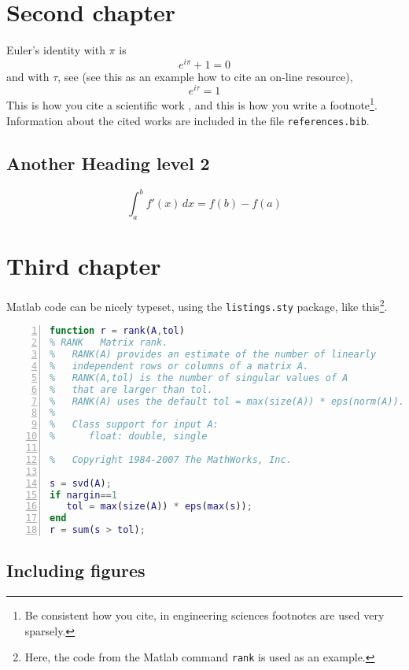 \documentclass[10pt,oneside,english]{lips}
\begin{document}
\section{Second chapter}
Euler's identity with $\pi$ is
\begin{equation}
  e^{i\pi} + 1 = 0
\end{equation}
and with $\tau$, see \citep{HartVi:2011} (see this as an example how
to cite an on-line resource), 
\begin{equation}
  e^{i\tau} = 1
\end{equation}
This is how you cite a scientific work \citep{einstein1905uber}, and
this is how you write a footnote\footnote{Be consistent how you cite,
  in engineering sciences footnotes are used very
  sparsely.}. Information about the cited works are included in the
file \texttt{references.bib}.

\subsection{Another Heading level 2}
\lipsum[10]

\begin{equation}
  \int_{a}^{b} f'(x)\,dx = f(b)-f(a)
\end{equation}

\section{Third chapter}
Matlab code can be nicely typeset, using the \texttt{listings.sty}
package, like this\footnote{Here, the code from the Matlab command
  \texttt{rank} is used as an example.}.
\begin{lstlisting}[language=Matlab,frame=single, numbers=left, stepnumber=2]
function r = rank(A,tol)
% RANK   Matrix rank.
%   RANK(A) provides an estimate of the number of linearly
%   independent rows or columns of a matrix A.
%   RANK(A,tol) is the number of singular values of A
%   that are larger than tol.
%   RANK(A) uses the default tol = max(size(A)) * eps(norm(A)).
%
%   Class support for input A:
%      float: double, single

%   Copyright 1984-2007 The MathWorks, Inc.

s = svd(A);
if nargin==1
   tol = max(size(A)) * eps(max(s));
end
r = sum(s > tol);
\end{lstlisting}

\subsection{Including figures}
\lipsum[7]
\end{document}
